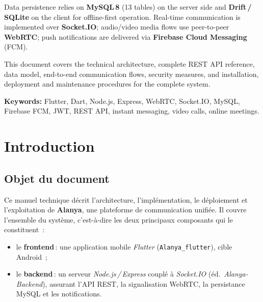 \documentclass[11pt,a4paper,oneside]{report}
\begin{document}
Data persistence relies on \textbf{MySQL\,8} (13 tables) on the server side and
\textbf{Drift\,/\,SQLite} on the client for offline-first operation.
Real-time communication is implemented over \textbf{Socket.IO}; audio/video
media flows use peer-to-peer \textbf{WebRTC}; push notifications are delivered
via \textbf{Firebase Cloud Messaging} (FCM).

This document covers the technical architecture, complete REST API reference,
data model, end-to-end communication flows, security measures, and installation,
deployment and maintenance procedures for the complete system.

\vspace{0.8cm}
\noindent\textbf{Keywords:} Flutter, Dart, Node.js, Express, WebRTC, Socket.IO,
MySQL, Firebase FCM, JWT, REST API, instant messaging, video calls, online meetings.

\renewcommand{\contentsname}{Table des mati\`{e}res}
\tableofcontents
\listoffigures
\listoftables

\chapter{Introduction}
\label{chap:intro}

\section{Objet du document}
Ce manuel technique d\'{e}crit l'architecture, l'impl\'{e}mentation, le d\'{e}ploiement et
l'exploitation de \textbf{Alanya}, une plateforme de communication unifi\'{e}e.
Il couvre l'ensemble du syst\`{e}me, c'est-\`{a}-dire les deux principaux composants qui
le constituent~:
\begin{itemize}[leftmargin=1.3em]
  \item le \textbf{frontend}\,: une application mobile \emph{Flutter}
        (\texttt{Alanya\_flutter}), cible Android~;
  \item le \textbf{backend}\,: un serveur \emph{Node.js\,/\,Express} coupl\'{e} \`{a}
        \emph{Socket.IO} (\'{e}d.\ \emph{Alanya-Backend}), assurant l'API REST,
        la signalisation WebRTC, la persistance MySQL et les notifications.
\end{itemize}
\end{document}
